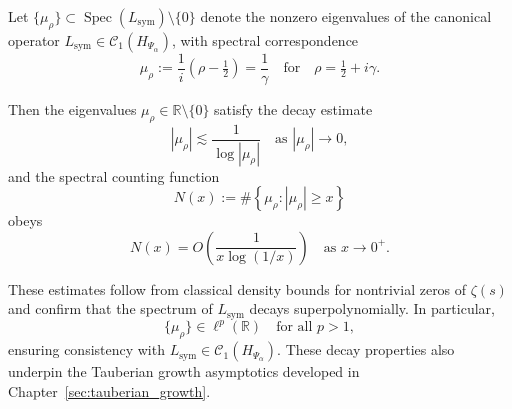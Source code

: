 \begin{lemma}
\label{lem:spectral_decay_bounds}
Let \( \{ \mu_\rho \} \subset \operatorname{Spec}(L_{\mathrm{sym}}) \setminus \{0\} \) denote the nonzero eigenvalues of the canonical operator \( L_{\mathrm{sym}} \in \mathcal{C}_1(H_{\Psi_\alpha}) \), with spectral correspondence
\[
\mu_\rho := \frac{1}{i}(\rho - \tfrac{1}{2}) = \frac{1}{\gamma}
\quad \text{for} \quad \rho = \tfrac{1}{2} + i\gamma.
\]

Then the eigenvalues \( \mu_\rho \in \mathbb{R} \setminus \{0\} \) satisfy the decay estimate
\[
|\mu_\rho| \lesssim \frac{1}{\log |\mu_\rho|} \quad \text{as } |\mu_\rho| \to 0,
\]
and the spectral counting function
\[
N(x) := \#\left\{ \mu_\rho : |\mu_\rho| \geq x \right\}
\]
obeys
\[
N(x) = O\left( \frac{1}{x \log (1/x)} \right) \quad \text{as } x \to 0^+.
\]

\medskip
\noindent
These estimates follow from classical density bounds for nontrivial zeros of \( \zeta(s) \) and confirm that the spectrum of \( L_{\mathrm{sym}} \) decays superpolynomially. In particular,
\[
\{ \mu_\rho \} \in \ell^p(\mathbb{R}) \quad \text{for all } p > 1,
\]
ensuring consistency with \( L_{\mathrm{sym}} \in \mathcal{C}_1(H_{\Psi_\alpha}) \). These decay properties also underpin the Tauberian growth asymptotics developed in Chapter~\ref{sec:tauberian_growth}.
\end{lemma}
